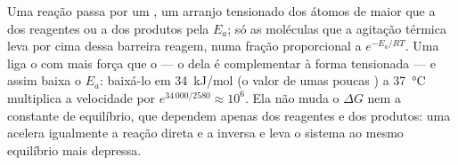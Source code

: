 \begin{proposition}\label{prop:b1:enzymes:whatitdoes}
Uma reação passa por um \emph{}, um arranjo tensionado
dos átomos de  maior que a dos reagentes ou a dos produtos
pela \emph{} $E_a$; só as moléculas que a agitação
térmica leva por cima dessa barreira reagem, numa fração proporcional a
$e^{-E_a/RT}$. Uma  liga o  com mais força que
o  --- o  dela é complementar à forma tensionada ---
e assim baixa o $E_a$: baixá-lo em \qty{34}{kJ/mol} (o valor de umas
poucas ) a \qty{37}{\celsius} multiplica a
velocidade por $e^{34\,000/2580} \approx
10^6$. Ela não muda o $\Delta G$ nem a constante de equilíbrio, que
dependem apenas dos reagentes e dos produtos: uma  acelera
igualmente a reação direta e a inversa e leva o sistema ao mesmo
equilíbrio mais depressa.
\end{proposition}

